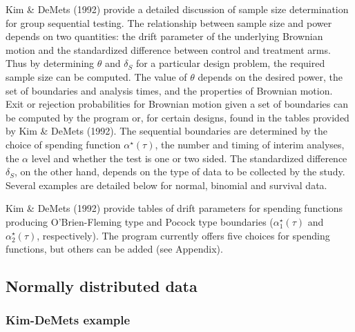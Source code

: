 Kim \& DeMets (1992) provide a detailed discussion of sample size
determination for group sequential testing.  The relationship between
sample size and power depends on two quantities: the drift parameter of the
underlying Brownian motion and the standardized difference between control
and treatment arms.  Thus by determining $\theta$ and $\delta_S$ for a
particular design problem, the required sample size can be computed.  The
value of $\theta$ depends on the desired power, the set of boundaries and
analysis times, and the properties of Brownian motion.  Exit or rejection
probabilities for Brownian motion given a set of boundaries can be computed
by the program or, for certain designs, found in the tables provided by Kim
\& DeMets (1992).  The sequential boundaries are determined by the choice
of spending function $\alpha^{\star}(\tau)$, the number and timing of
interim analyses, the $\alpha$ level and whether the test is one or two
sided.  The standardized difference $\delta_S$, on the other hand, depends
on the type of data to be collected by the study.  Several examples are
detailed below for normal, binomial and survival data.

Kim \& DeMets (1992) provide tables of drift parameters for spending
functions producing O'Brien-Fleming type and Pocock type boundaries
($\alpha_1^{\star}(\tau)$ and $\alpha_2^{\star}(\tau)$, respectively).  The
program currently offers five choices for spending functions, but others
can be added (see Appendix).


\subsection{Normally distributed data}

\subsubsection{Kim-DeMets example}

